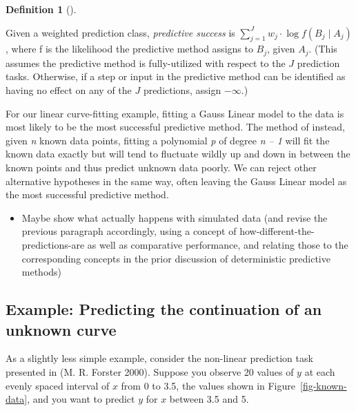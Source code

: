 \documentclass[
  letterpaper,
  DIV=11,
  numbers=noendperiod]{scrartcl}
\providecommand{\tightlist}{%
  \setlength{\itemsep}{0pt}\setlength{\parskip}{0pt}}\usepackage{longtable,booktabs,array}
\theoremstyle{definition}
\newtheorem{definition}{Definition}[section]
\theoremstyle{remark}
\begin{document}
\begin{definition}[]\protect\hypertarget{def-success}{}\label{def-success}

Given a weighted prediction class, \emph{predictive success} is
\(\sum_{j=1}^{J} w_j \cdot \log f(B_j \mid A_j)\), where f is the
likelihood the predictive method assigns to \(B_j\), given \(A_j\).
(This assumes the predictive method is fully-utilized with respect to
the \(J\) prediction tasks. Otherwise, if a step or input in the
predictive method can be identified as having no effect on any of the
\(J\) predictions, assign \(-\infty\).)

\end{definition}

For our linear curve-fitting example, fitting a Gauss Linear model to
the data is most likely to be the most successful predictive method. The
method of instead, given \emph{n} known data points, fitting a
polynomial \emph{p} of degree \emph{n -- 1} will fit the known data
exactly but will tend to fluctuate wildly up and down in between the
known points and thus predict unknown data poorly. We can reject other
alternative hypotheses in the same way, often leaving the Gauss Linear
model as the most successful predictive method.

\begin{itemize}
\tightlist
\item
  Maybe show what actually happens with simulated data (and revise the
  previous paragraph accordingly, using a concept of
  how-different-the-predictions-are as well as comparative performance,
  and relating those to the corresponding concepts in the prior
  discussion of deterministic predictive methods)
\end{itemize}

\subsection{Example: Predicting the continuation of an unknown
curve}\label{example-predicting-the-continuation-of-an-unknown-curve}

As a slightly less simple example, consider the non-linear prediction
task presented in (M. R. Forster 2000). Suppose you observe 20 values of
\(y\) at each evenly spaced interval of \(x\) from 0 to 3.5, the values
shown in Figure~\ref{fig-known-data}, and you want to predict \(y\) for
\(x\) between 3.5 and 5.
\end{document}
